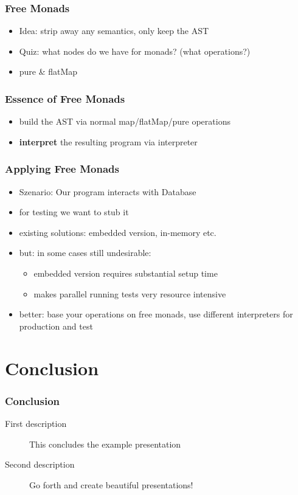 \documentclass{beamer}
\begin{document}
\begin{frame}
  \frametitle{Free Monads}
  \begin{itemize}
  \item<1> Idea: strip away any semantics, only keep the AST
  \item<1> Quiz: what nodes do we have for monads? (what operations?)
  \item<2> pure \& flatMap
  \end{itemize}
\end{frame}

\begin{frame}
  \frametitle{Essence of Free Monads}
  \begin{itemize}
  \item build the AST via normal map/flatMap/pure operations
  \item \textbf{interpret} the resulting program via interpreter
  \end{itemize}
\end{frame}

\begin{frame}
  \frametitle{Applying Free Monads}
  \begin{itemize}
  \item Szenario: Our program interacts with Database
  \item for testing we want to stub it
  \item existing solutions: embedded version, in-memory etc.
  \item but: in some cases still undesirable:
    \begin{itemize}
    \item embedded version requires substantial setup time
    \item makes parallel running tests very resource intensive
    \end{itemize}
  \item better: base your operations on free monads, use different
    interpreters for production and test
  \end{itemize}
\end{frame}

\section{Conclusion}

\begin{frame}
  \frametitle{Conclusion}
  \begin{description}
  \item[First description] This concludes the example presentation
  \item[Second description] Go forth and create beautiful presentations!
  \end{description}
\end{frame}
\end{document}
